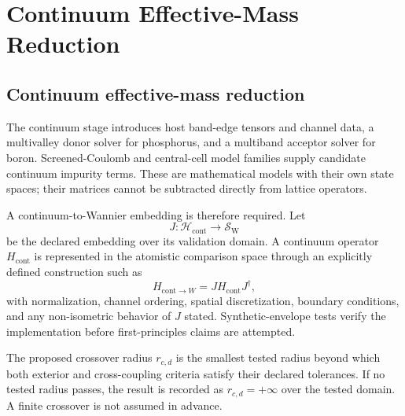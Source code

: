 \chapter{Continuum Effective-Mass Reduction}

\label{ch:continuum-effective-mass}


\section{Continuum effective-mass reduction}


The continuum stage introduces host band-edge tensors and channel data, a
multivalley donor solver for phosphorus, and a multiband acceptor solver for
boron. Screened-Coulomb and central-cell model families supply candidate
continuum impurity terms. These are mathematical models with their own state
spaces; their matrices cannot be subtracted directly from lattice operators.


A continuum-to-Wannier embedding is therefore required. Let
\begin{equation}
  J:\mathcal H_{\mathrm{cont}}\longrightarrow\mathcal S_{\mathrm W}
\end{equation}
be the declared embedding over its validation domain. A continuum operator
$H_{\mathrm{cont}}$ is represented in the atomistic comparison space through
an explicitly defined construction such as
\begin{equation}
  H_{\mathrm{cont}\rightarrow W}=JH_{\mathrm{cont}}J^{\dagger},
\end{equation}
with normalization, channel ordering, spatial discretization, boundary
conditions, and any non-isometric behavior of $J$ stated. Synthetic-envelope
tests verify the implementation before first-principles claims are attempted.

The proposed crossover radius $r_{c,d}$ is the smallest tested radius beyond
which both exterior and cross-coupling criteria satisfy their declared
tolerances. If no tested radius passes, the result is recorded as
$r_{c,d}=+\infty$ over the tested domain. A finite crossover is not assumed in
advance.
